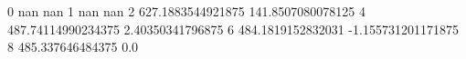 0 nan nan
1 nan nan
2 627.1883544921875 141.8507080078125
4 487.74114990234375 2.40350341796875
6 484.1819152832031 -1.155731201171875
8 485.337646484375 0.0
